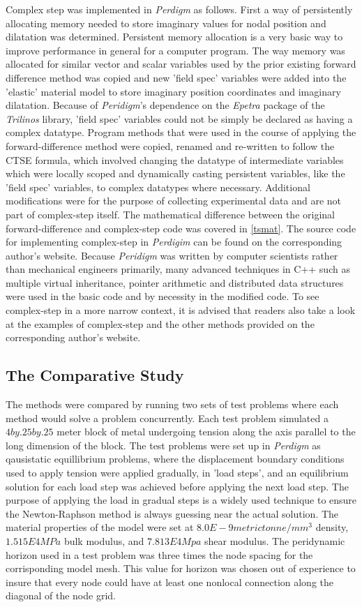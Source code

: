 \documentclass[preprint,12pt]{elsarticle}
\begin{document}
Complex step was implemented in \emph{Perdigm} as follows. First a way of persistently allocating
memory needed to store imaginary values for nodal position and dilatation was determined. Persistent
memory allocation is a very basic way to improve performance in general for a computer program. The
way memory was allocated for similar vector and scalar variables used by the prior existing forward
difference method was copied and new 'field spec' variables were added into the 'elastic' material
model to store imaginary position coordinates and imaginary dilatation. Because of \emph{Peridigm}'s
dependence on the \emph{Epetra} package of the \emph{Trilinos} library, 'field spec' variables could
not be simply be declared as having a complex datatype. Program methods that were used in the
course of applying the forward-difference method were copied, renamed and re-written to follow the
CTSE formula, which involved changing the datatype of intermediate variables which were locally
scoped and dynamically casting persistent variables, like the 'field spec' variables, to complex
datatypes where necessary. Additional modifications were for the purpose of collecting experimental
data and are not part of complex-step itself. The mathematical difference between the original
forward-difference and complex-step code was covered in \ref{tsmat}. The source code for
implementing complex-step in \emph{Perdigim} can be found on the corresponding author's website.
Because \emph{Peridigm} was written by computer scientists rather than mechanical engineers
primarily, many advanced techniques in C++ such as multiple virtual inheritance, pointer arithmetic
and distributed data structures were used in the basic code and by necessity in the modified code.
To see complex-step in a more narrow context, it is advised that readers also take a look at the
examples of complex-step and the other methods provided on the corresponding author's website.

\subsection{The Comparative Study} 

The methods were compared by running two sets of test problems where each method would solve a
problem concurrently. Each test problem simulated a $4 by .25 by .25$ meter block of metal
undergoing tension along the axis parallel to the long dimension of the block. The test problems
were set up in \emph{Perdigm} as qausistatic equillibrium problems, where the displacement boundary
conditions used to apply tension were applied gradually, in 'load steps', and an equilibrium
solution for each load step was achieved before applying the next load step. The purpose of applying
the load in gradual steps is a widely used technique to ensure the Newton-Raphson method is always
guessing near the actual solution. The material properties of the model were set at $8.0E-9 metric
tonne/ mm^3$ density, $1.515E4 MPa$ bulk modulus, and $7.813E4 Mpa$ shear modulus. The peridynamic
horizon used in a test problem was three times the node spacing for the corrisponding model mesh.
This value for horizon was chosen out of experience to insure that every node could have at least
one nonlocal connection along the diagonal of the node grid.
\end{document}
